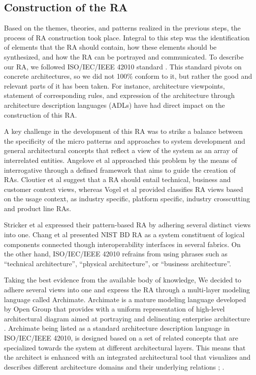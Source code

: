 \documentclass[review]{elsarticle}
\begin{document}
\subsection{Construction of the RA}

Based on the themes, theories, and patterns realized in the previous steps, the process of RA construction took place. Integral to this step was the identification of elements that the RA should contain, how these elements should be synthesized, and how the RA can be portrayed and communicated. To describe our RA, we followed ISO/IEC/IEEE 42010 standard \cite{ISO42010}. This standard pivots on concrete architectures, so we did not 100\% conform to it, but rather the good and relevant parts of it has been taken. For instance, architecture viewpoints, statement of corresponding rules, and expression of the architecture through architecture description languages (ADLs) have had direct impact on the construction of this RA.

A key challenge in the development of this RA was to strike a balance between the specificity of the micro patterns and approaches to system development and general architectural concepts that reflect a view of the system as an array of interrelated entities. Angelove et al \cite{angelov2012framework} approached this problem by the means of interrogative through a defined framework that aims to guide the creation of RAs.
Cloutier et al \cite{Cloutier} suggest that a RA should entail technical, business and customer context views, whereas Vogel et al \cite{vogel2009software} provided classifies RA views based on the usage context, as industry specific, platform specific, industry crosscutting and product line RAs.

Stricker et al \cite{Stricker} expressed their pattern-based RA by adhering several distinct views into one. Chang et al \cite{Chang} presented NIST BD RA as a system constituent of logical components connected though interoperability interfaces in several fabrics. On the other hand, ISO/IEC/IEEE 42010 refrains from using phrases such as “technical architecture”, “physical architecture”, or “business architecture”.

Taking the best evidence from the available body of knowledge, We decided to adhere several views into one and express the RA through a multi-layer modeling language called Archimate. Archimate is a mature modeling language developed by Open Group that provides with a uniform representation of high-level architectural diagram aimed at portraying and delineating enterprise architecture \cite{lankhorst2013language}. Archimate being listed as a standard architecture description language in ISO/IEC/IEEE 42010, is designed based on a set of related concepts that are specialized towards the system at different architectural layers. This means that the architect is enhanced with an integrated architectural tool that visualizes and describes different architecture domains and their underlying relations \cite{lankhorst2010anatomy}; \cite{engelsman2011extending}.
\end{document}
